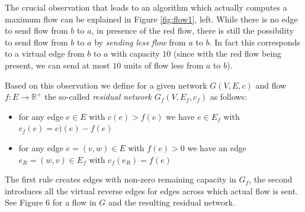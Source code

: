 \documentclass{article}
\begin{document}
The crucial observation that leads to an algorithm which actually computes a maximum flow can  be explained in Figure \ref{fig:flow1}, left. While there is no edge to send flow from $b$ to $a$, in presence of the red flow, there is still the possibility to send flow from $b$ to $a$ by \emph{sending less flow} from $a$ to $b$. In fact this corresponds to a virtual edge from $b$ to $a$ with capacity $10$ (since with the red flow being present, we can send at most $10$ units of flow less from $a$ to $b$).

Based on this observation we define for a given network $G(V,E,c)$ and flow $f:E\rightarrow \mathbb{R}^+$ the so-called \emph{residual network} $G_f(V, E_f, c_f)$ as follows:
\begin{itemize}
\item for any edge $e\in E$ with $c(e)>f(e)$ we have $e\in E_f$ with $c_f(e)=c)(e)-f(e)$
\item for any edge $e=(v,w)\in E$ with $f(e)>0$ we have an edge $e_R=(w,v)\in E_f$ with $c_f(e_R)=f(e)$
\end{itemize}
The first rule creates edges with non-zero remaining capacity in $G_f$, the second introduces all the virtual reverse edges for edges across which actual flow is sent. See Figure 6 for a flow in $G$ and the resulting residual network.
\end{document}
